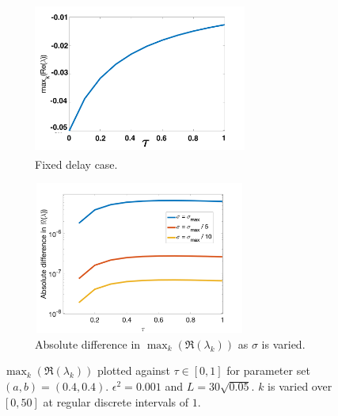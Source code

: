 \begin{figure}[H]
    \centering
    \begin{subfigure}[b]{0.45\textwidth}
        \centering
        \includegraphics[width=7cm,height=5cm]{p3fixed.png}
        \caption{Fixed delay case.}
        \label{}
    \end{subfigure}
    \hfill
    \begin{subfigure}[b]{0.45\textwidth}
        \centering
        \includegraphics[width=7cm,height=5cm]{dispdiff2.png}
        \caption{Absolute difference in $\max_k(\Re(\lambda_k))$ as $\sigma$ is varied.}
        \label{}
    \end{subfigure}
    \caption{$\max_k(\Re(\lambda_k))$ plotted against $\tau\in[0,1]$ for parameter set $(a,b)=(0.4,0.4)$. $\epsilon^2=0.001$ and $L=30\sqrt{0.05}$. $k$ is varied over $[0,50]$ at regular discrete intervals of $1$.}
    \label{fig:p3}
\end{figure}

